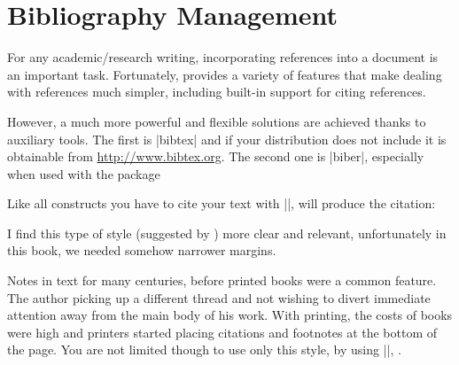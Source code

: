 \chapter{Bibliography Management} 


\begin{refsection}
 


For any academic/research writing, incorporating references into a document is an important task. Fortunately, \latex provides  a variety of features that make dealing with references much simpler, including built-in support for citing references. 

However, a much more powerful and flexible solutions are achieved thanks to auxiliary tools. The first is |bibtex| and if your \latex  distribution does not include it is obtainable from \url{http://www.bibtex.org}. The second one is |biber|, especially when used with the package 


Like all \latexe constructs you have to cite your text with  |\cite{Abrahams2003}|, will produce the citation:

\begin{scriptexample}[]{}

\cite{companion}

\end{scriptexample}
 
 
I find this type of style (suggested by \cite{Tufte1997}) more clear and relevant, unfortunately in this book, we needed somehow narrower margins.

Notes in text for many centuries, before printed books were a common feature. The author picking up a different thread and not wishing to divert immediate attention away from the main body of his work. With printing, the costs of books were high and printers started placing citations and footnotes at the bottom of the page. You are not limited though to use only this style, by using |\cite{Bringhurst2005}|, \cite{Bringhurst2005}.


\end{refsection}

